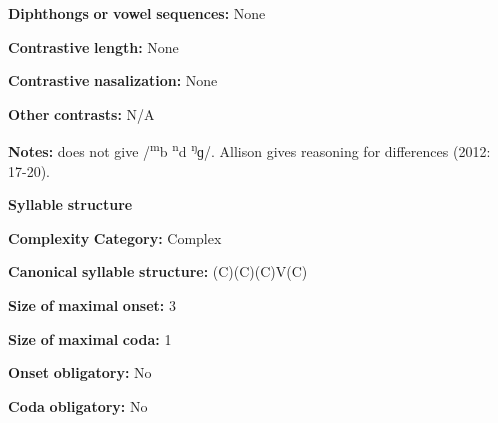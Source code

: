 \documentclass[output=paper]{langsci/langscibook}
\begin{document}
\begin{styleBody}
\textbf{Diphthongs} \textbf{or} \textbf{vowel} \textbf{sequences:} None
\end{styleBody}

\begin{styleBody}
\textbf{Contrastive} \textbf{length:} None
\end{styleBody}

\begin{styleBody}
\textbf{Contrastive} \textbf{nasalization:} None
\end{styleBody}

\begin{styleBody}
\textbf{Other} \textbf{contrasts:} N/A
\end{styleBody}

\begin{styleBody}
\textbf{Notes:} \citet{Mahamat2005} does not give /\textsuperscript{m}b \textsuperscript{n}d \textsuperscript{ŋ}ɡ/. Allison gives reasoning for differences (2012: 17-20).
\end{styleBody}

\begin{styleBody}
\textbf{Syllable} \textbf{structure}
\end{styleBody}

\begin{styleBody}
\textbf{Complexity} \textbf{Category:} Complex
\end{styleBody}

\begin{styleBody}
\textbf{Canonical} \textbf{syllable} \textbf{structure:} (C)(C)(C)V(C) \citep[23-24]{Allison2012}
\end{styleBody}

\begin{styleBody}
\textbf{Size} \textbf{of} \textbf{maximal} \textbf{onset:} 3
\end{styleBody}

\begin{styleBody}
\textbf{Size} \textbf{of} \textbf{maximal} \textbf{coda:} 1
\end{styleBody}

\begin{styleBody}
\textbf{Onset} \textbf{obligatory:} No
\end{styleBody}

\begin{styleBody}
\textbf{Coda} \textbf{obligatory:} No
\end{styleBody}
\end{document}
